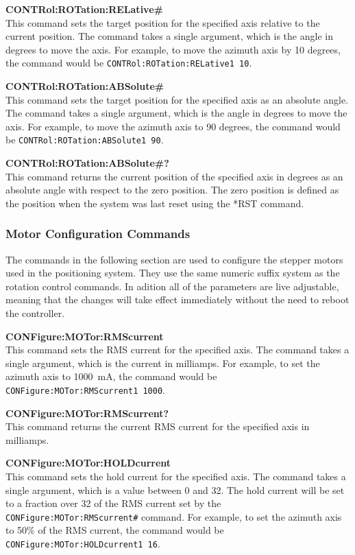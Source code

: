 \textbf{CONTRol:ROTation:RELative\#} \\
This command sets the target position for the specified axis relative to the current position. The command takes a single argument, which is the angle in degrees to move the axis. For example, to move the azimuth axis by 10 degrees, the command would be \texttt{CONTRol:ROTation:RELative1 10}.

\textbf{CONTRol:ROTation:ABSolute\#} \\
This command sets the target position for the specified axis as an absolute angle. The command takes a single argument, which is the angle in degrees to move the axis. For example, to move the azimuth axis to 90 degrees, the command would be \texttt{CONTRol:ROTation:ABSolute1 90}.

\textbf{CONTRol:ROTation:ABSolute\#?} \\
This command returns the current position of the specified axis in degrees as an absolute angle with respect to the zero position. The zero position is defined as the position when the system was last reset using the *RST command.

\subsubsection{Motor Configuration Commands}

The commands in the following section are used to configure the stepper motors used in the positioning system. They use the same numeric suffix system as the rotation control commands. In adition all of the parameters are live adjustable, meaning that the changes will take effect immediately without the need to reboot the controller.

\textbf{CONFigure:MOTor:RMScurrent} \\
This command sets the RMS current for the specified axis. The command takes a single argument, which is the current in milliamps. For example, to set the azimuth axis to \SI{1000}{\milli\ampere}, the command would be \texttt{CONFigure:MOTor:RMScurrent1 1000}.

\textbf{CONFigure:MOTor:RMScurrent?} \\
This command returns the current RMS current for the specified axis in milliamps.

\textbf{CONFigure:MOTor:HOLDcurrent} \\
This command sets the hold current for the specified axis. The command takes a single argument, which is a value between 0 and 32. The hold current will be set to a fraction over 32 of the RMS current set by the \texttt{CONFigure:MOTor:RMScurrent\#} command. For example, to set the azimuth axis to 50\% of the RMS current, the command would be \texttt{CONFigure:MOTor:HOLDcurrent1 16}.

